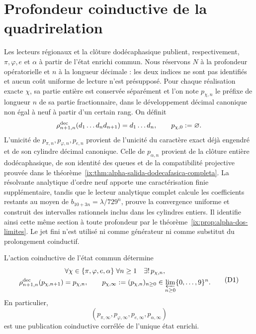 \section{Profondeur coinductive de la quadrirelation}
\label{ix:sec:profundidad-cuatrirrelacion-ch}

Les lecteurs régionaux et la clôture dodécaphasique publient, respectivement, \(\pi,\varphi,e\) et \(\alpha\) à partir de l'état enrichi commun. Nous réservons \(N\) à la profondeur opératorielle et \(n\) à la longueur décimale : les deux indices ne sont pas identifiés et aucun coût uniforme de lecture n'est présupposé. Pour chaque réalisation exacte \(\chi\), sa partie entière est conservée séparément et l'on note \(p_{\chi,n}\) le préfixe de longueur \(n\) de sa partie fractionnaire, dans le développement décimal canonique non égal à neuf à partir d'un certain rang. On définit
\[
 \rho^{\rm dec}_{n+1,n}(d_1\ldots d_nd_{n+1})=d_1\ldots d_n,
 \qquad p_{\chi,0}:=\varnothing.
\]
L’unicité de \(p_{\pi,n},p_{\varphi,n},p_{e,n}\) provient de l’unicité du
caractère exact déjà engendré et de son cylindre décimal canonique. Celle de
\(p_{\alpha,n}\) provient de la clôture entière dodécaphasique, de son identité
des queues et de la compatibilité projective prouvée dans le
théorème~\ref{ix:thm:alpha-salida-dodecafasica-completa}. La résolvante analytique
d’ordre neuf apporte une caractérisation finie supplémentaire, tandis que le
lecteur analytique complet calcule les coefficients restants au moyen de
\(b_{10+3n}=\lambda/729^n\), prouve la convergence uniforme et construit
des intervalles rationnels inclus dans les cylindres entiers. Il identifie ainsi
cette même section à toute profondeur par le
théorème~\ref{ix:prop:alpha-dos-limites}. Le jet fini n’est utilisé ni comme
générateur ni comme substitut du prolongement coinductif.

\begin{theorem}
\label{ix:thm:profundidad-cuatrirrelacion-ch}
L’action coinductive de l’état commun détermine
\[
 \begin{gathered}
  \forall\chi\in\{\pi,\varphi,e,\alpha\}\;
  \forall n\ge1\quad\exists!\,p_{\chi,n},\\
  \rho^{\rm dec}_{n+1,n}(p_{\chi,n+1})=p_{\chi,n},
  \qquad
  p_{\chi,\infty}:=(p_{\chi,n})_{n\ge0}
  \in\varprojlim_{n\ge0}\{0,\ldots,9\}^{n}.
 \end{gathered}
\tag{D1}
\label{ix:eq:profundidad-cuatrirrelacion-ch}
\]
En particulier,
\[
 (p_{\pi,\infty},p_{\varphi,\infty},p_{e,\infty},p_{\alpha,\infty})
\tag{D2}
\label{ix:eq:cuatrirrelacion-infinita-ch}
\]
est une publication coinductive corrélée de l’unique état enrichi.
\end{theorem}

